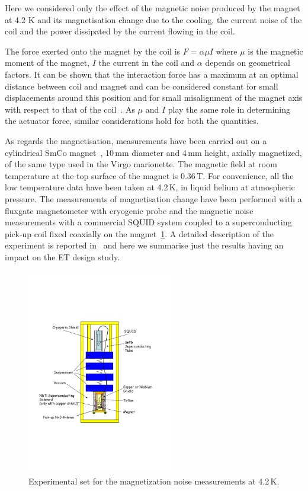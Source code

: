 Here we considered only the effect of the magnetic noise produced by the magnet at 4.2 K and its magnetisation change due to the cooling, the current noise of the coil and the power dissipated by the current flowing in the coil.

The force exerted onto the magnet by the coil is $F= \alpha \mu I$  where $\mu$ is the magnetic moment of the magnet, $I$ the current in the coil and $\alpha$ depends on geometrical factors. It can be shown that the interaction force has a maximum at an optimal distance between coil and magnet and can be considered constant for small displacements around this position and for small misalignment of the magnet axis with respect to that of the coil~\cite{LSSpaper1999}.
As $\mu$ and $I$ play the same role in determining the actuator force, similar considerations hold for both the quantities. 

As regards the magnetisation, measurements  have been carried out on a cylindrical SmCo magnet~\cite{MagneticShop}, 10\,mm diameter and  4\,mm height, axially magnetized, of the same type used in the Virgo marionette. The magnetic field at room temperature at the top surface of the magnet is 0.36\,T.
For convenience, all the low temperature data have been taken at 4.2\,K, in liquid helium at atmospheric pressure.
The measurements of magnetisation change have been performed with a fluxgate magnetometer with cryogenic probe and the magnetic noise measurements with a commercial SQUID system coupled to a superconducting pick-up coil fixed coaxially on the magnet~\ref{fig:SQUID_setup}. A detailed description of the experiment is reported in~\cite{Falferi_preparation} and here we summarise just the results having an impact on the ET design study. 

\begin{figure}[htbp]
\begin{center}
	\includegraphics[height=90mm]{Sec_Suspensions/Figures/SQUID_setup.pdf}
	\caption{Experimental set for the magnetization noise measurements at 4.2\,K.}
	\label{fig:SQUID_setup}
\end{center}
\end{figure}


